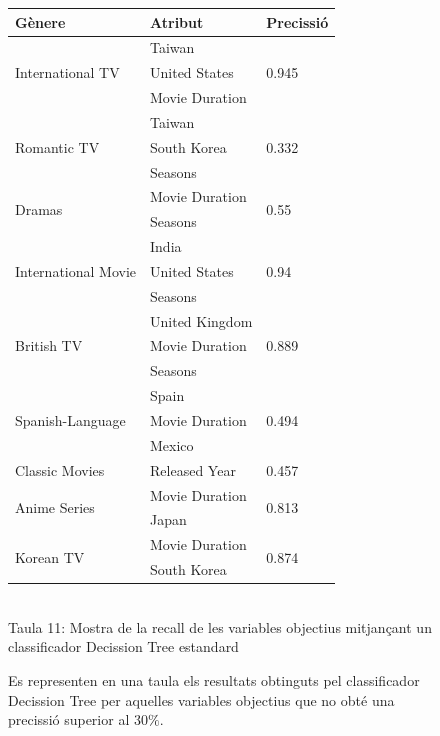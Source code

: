 \documentclass[a4paper, 11pt]{article}
\begin{document}
\begin{figure}[h]
\begin{minipage}{5cm}
\begin{center}
\end{center}
\end{minipage} %
\hspace{2em}
\begin{minipage}{9cm} %
\begin{center}
    \begin{tabular}{l|l|l}
        \textbf{Gènere} & \textbf{Atribut} & \textbf{Precissió}\\\hline\hline
            \multirow{3}{*}{International TV} &  Taiwan & \multirow{3}{*}{0.945} \\
            & United States & \\
            & Movie Duration& \\ \hline
        \multirow{3}{*}{Romantic TV} &  Taiwan & \multirow{3}{*}{0.332} \\
            & South Korea & \\
            & Seasons & \\ \hline
        \multirow{2}{*}{Dramas} &  Movie Duration & \multirow{2}{*}{0.55} \\
        & Seasons & \\\hline
        \multirow{3}{*}{International Movie} &  India & \multirow{3}{*}{0.94} \\
            & United States & \\
            & Seasons & \\ \hline
        \multirow{3}{*}{British TV} &  United Kingdom & \multirow{3}{*}{0.889} \\
            & Movie Duration & \\
            & Seasons & \\ \hline
        \multirow{3}{*}{Spanish-Language} &  Spain & \multirow{3}{*}{0.494} \\
            & Movie Duration & \\
            & Mexico & \\ \hline
        Classic Movies & Released Year & 0.457 \\ \hline 
        \multirow{2}{*}{Anime Series} & Movie Duration & \multirow{2}{*}{0.813}\\
        & Japan & \\ \hline
        \multirow{2}{*}{Korean TV} & Movie Duration & \multirow{2}{*}{0.874}\\
        & South Korea & \\ 
        
    \end{tabular}
    \label{tab:afins}
    \\
    Taula 11: Mostra de la recall de les variables objectius mitjançant un classificador Decission Tree estandard   \setcounter{table}{11}
\end{center}
Es representen en una taula els resultats obtinguts pel classificador Decission Tree per aquelles variables objectius que no obté una precissió superior al $30\%$.
\end{minipage} %
\end{figure} %
\end{document}

